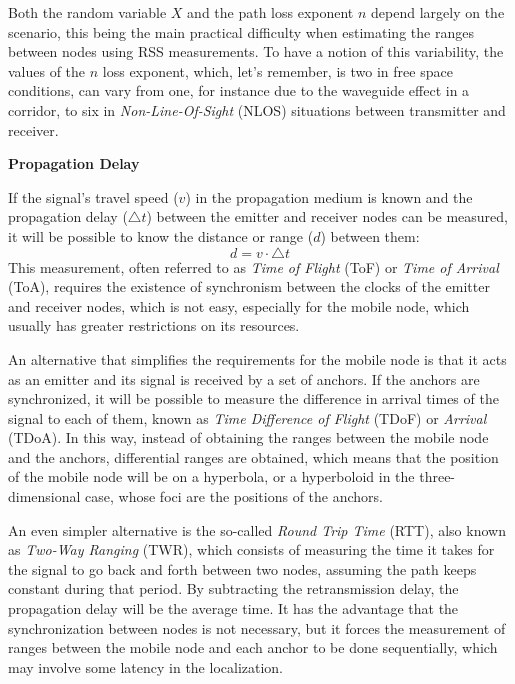 \begin{description}
	Both the random variable $X$ and the path loss exponent $n$ depend largely on the scenario, this being the main practical difficulty when estimating the ranges between nodes using RSS measurements. To have a notion of this variability, the values of the $n$ loss exponent, which, let's remember, is two in free space conditions, can vary from one, for instance due to the waveguide effect in a corridor, to six in \emph{Non-Line-Of-Sight} (NLOS) situations between transmitter and receiver.
	\item \textbf{Propagation Delay}
	
	If the signal's travel speed ($v$) in the propagation medium is known and the propagation delay ($\triangle t$) between the emitter and receiver nodes can be measured, it will be possible to know the distance or range ($d$) between them:
	\begin{equation}
	\label{eqn_tof}
		d=v \cdot \triangle t
	\end{equation}	
	This measurement, often referred to as \emph{Time of Flight} (ToF) or \emph{Time of Arrival} (ToA), requires the existence of synchronism between the clocks of the emitter and receiver nodes, which is not easy, especially for the mobile node, which usually has greater restrictions on its resources.
			
	An alternative that simplifies the requirements for the mobile node is that it acts as an emitter and its signal is received by a set of anchors.
	If the anchors are synchronized, it will be possible to measure the difference in arrival times of the signal to each of them, known as \emph{Time Difference of Flight} (TDoF) or \emph{Arrival} (TDoA). 
	In this way, instead of obtaining the ranges between the mobile node and the anchors, differential ranges are obtained, which means that the position of the mobile node will be on a hyperbola, or a hyperboloid in the three-dimensional case, whose foci are the positions of the anchors.
	
	An even simpler alternative is the so-called \emph{Round Trip Time} (RTT), also known as \emph{Two-Way Ranging} (TWR), which consists of measuring the time it takes for the signal to go back and forth between two nodes, assuming the path keeps constant during that period.
	By subtracting the retransmission delay, the propagation delay will be the average time.	
	It has the advantage that the synchronization between nodes is not necessary, but it forces the measurement of ranges between the mobile node and each anchor to be done sequentially, which may involve some latency in the localization. 
			

\end{description}
